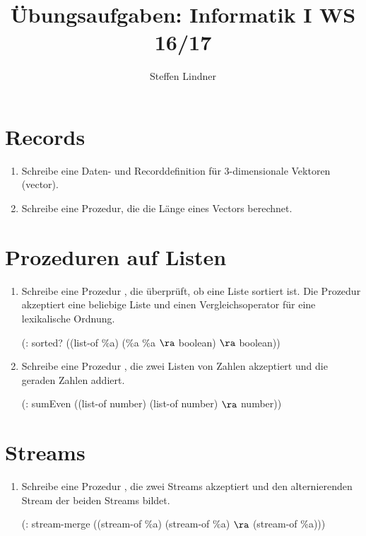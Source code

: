 \documentclass[11pt]{article}
\title{Übungsaufgaben: Informatik I WS 16/17}
\author{Steffen Lindner}
\begin{document}
\maketitle

\section{Records}

\begin{enumerate}
	\item Schreibe eine Daten- und Recorddefinition für 3-dimensionale Vektoren (vector).
	\item Schreibe eine Prozedur, die die Länge eines Vectors berechnet.
\end{enumerate}

\section{Prozeduren auf Listen}

\begin{enumerate}
	\item Schreibe eine Prozedur , die überprüft, ob eine Liste sortiert ist. Die Prozedur akzeptiert eine beliebige Liste und einen Vergleichsoperator für eine lexikalische Ordnung.
	
	\begin{center}
		(: sorted? ((list-of \%a) (\%a \%a $\ra$ boolean) $\ra$ boolean)) 
	\end{center}
	
	\item Schreibe eine Prozedur , die zwei Listen von Zahlen akzeptiert und die geraden Zahlen addiert.
	
	\begin{center}
		(: sumEven ((list-of number) (list-of number) $\ra$ number))	
	\end{center}
\end{enumerate}

\section{Streams}

\begin{enumerate}
	\item Schreibe eine Prozedur , die zwei Streams akzeptiert und den alternierenden Stream der beiden Streams bildet.
	
	\begin{center}
		(: stream-merge ((stream-of \%a) (stream-of \%a) $\ra$ (stream-of \%a)))
	\end{center}
\end{enumerate}
\end{document}
